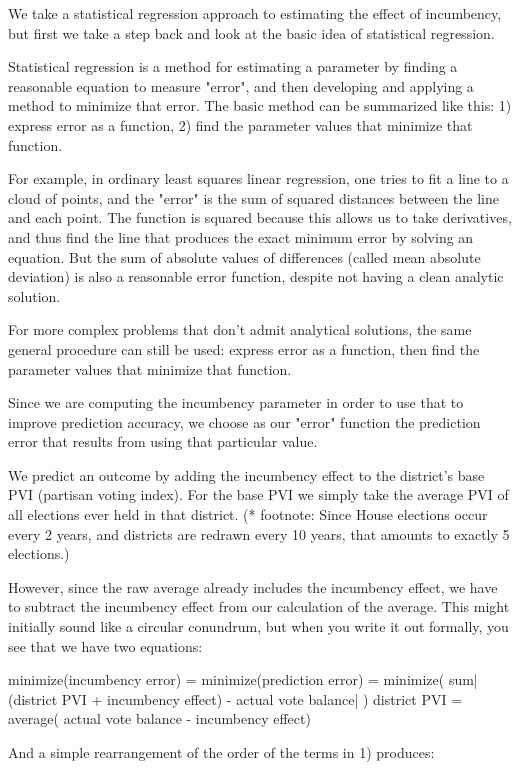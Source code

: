 \documentclass[preprint,12pt]{article}
\begin{document}
We take a statistical regression approach to estimating the effect of incumbency, but first we take a step back and look at the basic idea of statistical regression.

Statistical regression is a method for estimating a parameter by finding a reasonable equation to measure "error", and then developing and applying a method to minimize that error.  The basic method can be summarized like this: 1) express error as a function, 2) find the parameter values that minimize that function. 

For example, in ordinary least squares linear regression, one tries to fit a line to a cloud of points, and the "error" is the sum of squared distances between the line and each point.   The function is squared because this allows us to take derivatives, and thus find the line that produces the exact minimum error by solving an equation.  But the sum of absolute values of differences (called mean absolute deviation) is also a reasonable error function, despite not having a clean analytic solution.

For more complex problems that don't admit analytical solutions, the same general procedure can still be used: express error as a function, then find the parameter values that minimize that function. 

Since we are computing the incumbency parameter in order to use that to improve prediction accuracy, we choose as our "error" function the prediction error that results from using that particular value.

We predict an outcome by adding the incumbency effect to the district's base PVI (partisan voting index).  For the base PVI we simply take the average PVI of all elections ever held in that district.  (* footnote: Since House elections occur every 2 years, and districts are redrawn every 10 years, that amounts to exactly 5 elections.)

However, since the raw average already includes the incumbency effect, we have to subtract the incumbency effect from our calculation of the average.  This might initially sound like a circular conundrum, but when you write it out formally, you see that we have two equations:

minimize(incumbency error) = minimize(prediction error) = minimize( sum| (district PVI + incumbency effect) - actual vote balance| )
district PVI = average( actual vote balance - incumbency effect)


And a simple rearrangement of the order of the terms in 1) produces:
\end{document}
